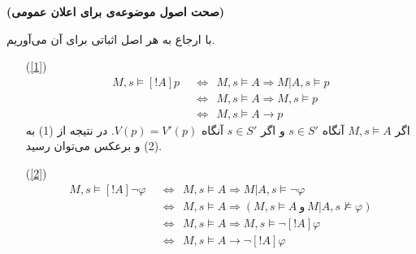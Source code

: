 \begin{theorem}\label{reduct1}\textbf{(صحت اصول موضوعه‌ی  {\reduction} برای اعلان عمومی)}
\end{theorem}
\bp
با ارجاع به هر اصل اثباتی برای آن می‌آوریم.
\begin{itemize}
\item[(\ref{1})]
\begin{align*}
M,s\vDash [!A]p &\ \ \Leftrightarrow\ \ M,s\vDash A\Rightarrow M|A,s\vDash p\tag{1}\\
&\ \ \Leftrightarrow\ \ M,s\vDash A\Rightarrow M,s\vDash p\tag{2}\\
&\ \ \Leftrightarrow\ \ M,s\vDash A\rightarrow p
\end{align*}
اگر $ M,s\vDash A $ آنگاه $ s\in S' $ و اگر $ s\in S' $  آنگاه $ V(p)=V'(p) $. در نتیجه از (1) به (2) و برعکس می‌توان رسید.
\item[(\ref{2})]
\begin{align*}
M,s\vDash[!A]\neg\varphi &\ \ \Leftrightarrow\ \ M,s\vDash A\Rightarrow M|A,s\vDash\neg \varphi\\
&\ \ \Leftrightarrow\ \ M,s\vDash A\Rightarrow (M,s\vDash A\ \textrm{و}\  M|A,s\nvDash\varphi)\\
&\ \ \Leftrightarrow\ \ M,s\vDash A\Rightarrow M,s\vDash\neg[!A]\varphi\\
&\ \ \Leftrightarrow\ \ M,s\vDash A\rightarrow\neg[!A]\varphi
\end{align*}
\end{itemize}
\ep
